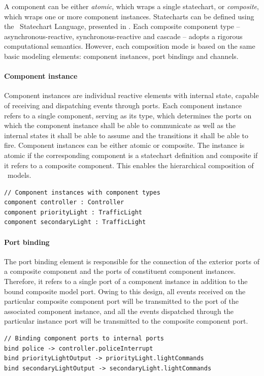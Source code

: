 A component can be either \emph{atomic}, which wraps a single statechart, or \emph{composite}, which wraps one or more component instances. Statecharts can be defined using the \gamma\ Statechart Language, presented in \cite{graics-bence-bsc}. Each composite component type -- asynchronous-reactive, synchronous-reactive and cascade -- adopts a rigorous computational semantics. However, each composition mode is based on the same basic modeling elements: component instances, port bindings and channels.

\paragraph{Component instance} Component instances are individual reactive elements with internal state, capable of receiving
and dispatching events through ports. Each component instance refers to a single
component, serving as its type, which determines the ports on which
the component instance shall be able to communicate as well as the internal states it shall
be able to assume and the transitions it shall be able to fire. Component instances can
be either atomic or composite. The instance is atomic if the corresponding component is a
statechart definition and composite if it refers to a composite component. This enables the
hierarchical composition of \gamma\ models.

\begin{lstlisting}
// Component instances with component types
component controller : Controller
component priorityLight : TrafficLight
component secondaryLight : TrafficLight
\end{lstlisting}

\paragraph{Port binding} The port binding element is responsible for the connection of the exterior
ports of a composite component and the ports of constituent component instances. Therefore,
it refers to a single port of a component instance in addition to the bound composite model port. Owing to this design, all events received on the particular composite component port will be transmitted to the port of the associated
component instance, and all the events dispatched through the particular instance port will
be transmitted to the composite component port.

\begin{lstlisting}
// Binding component ports to internal ports
bind police -> controller.policeInterrupt
bind priorityLightOutput -> priorityLight.lightCommands
bind secondaryLightOutput -> secondaryLight.lightCommands
\end{lstlisting}

